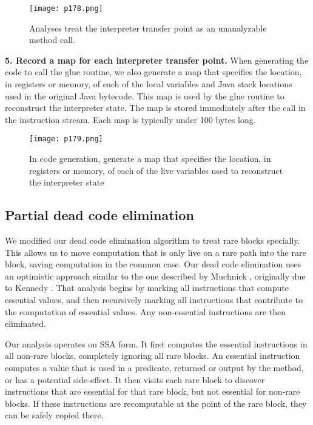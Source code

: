 \begin{figure}[H]
	\centering
	\texttt{[image: p178.png]}
	\caption{Analyses treat the interpreter transfer point as an unanalyzable method call.}
	\label{fig:p178}
\end{figure}

\textbf{5. Record a map for each interpreter transfer
	point.}
When generating the code to call the glue routine, we
also generate a map that specifies the location, in registers or memory, of each of the local variables and
Java stack locations used in the original Java bytecode.
This map is used by the glue routine to reconstruct the
interpreter state. The map is stored immediately after the call in the instruction stream. Each map is
typically under 100 bytes long.


\begin{figure}[H]
	\centering
	\texttt{[image: p179.png]}
	\caption{In code generation, generate a map that specifies the location, in registers
		or memory, of each of the live variables used to reconstruct the interpreter state}
	\label{fig:p179}
\end{figure}




\subsection{Partial dead code elimination}

We modified our dead code elimination algorithm to treat
rare blocks specially. This allows us to move computation
that is only live on a rare path into the rare block, saving
computation in the common case.
Our dead code elimination uses an optimistic approach similar to the one described by Muchnick \cite{muchnick1997advanced}, originally due to
Kennedy \cite{kennedy1979survey}. That analysis begins by marking all instructions that compute essential values, and then recursively marking all instructions that contribute to the computation
of essential values. Any non-essential instructions are then
eliminated.

Our analysis operates on SSA form. It first computes the
essential instructions in all non-rare blocks, completely ignoring all rare blocks. An essential instruction computes a
value that is used in a predicate, returned or output by the
method, or has a potential side-effect.
It then visits each
rare block to discover instructions that are essential for that
rare block, but not essential for non-rare blocks. If these
instructions are recomputable at the point of the rare block,
they can be safely copied there.


